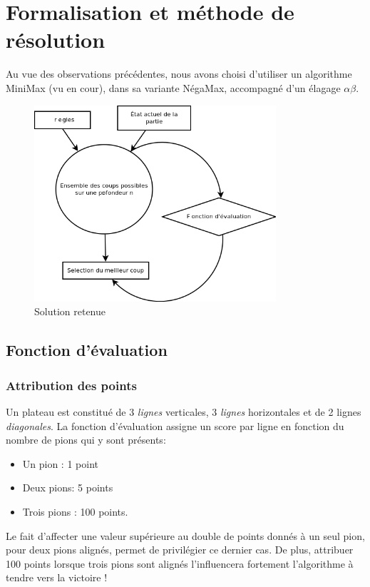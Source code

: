 \documentclass[a4paper,12pt]{article}
\begin{document}
\section{Formalisation et méthode de résolution}
Au vue des observations précédentes, nous avons choisi d'utiliser un algorithme MiniMax (vu en cour), dans sa variante NégaMax, accompagné d'un élagage $\alpha\beta$.
\begin{figure}[H]
    \includegraphics[width=0.8\textwidth]{./pix/methode.png}
    \centering
    \caption{Solution retenue}
\end{figure}

\subsection{Fonction d'évaluation}
\subsubsection{Attribution des points}
Un plateau est constitué de 3 \emph{lignes} verticales, 3 \emph{lignes} horizontales et de 2 lignes \emph{diagonales}. La fonction d'évaluation assigne un score par ligne en fonction du nombre de pions qui y sont présents:
\vspace{1em} %
\begin{itemize}
	\item Un pion : 1 point
	\item Deux pions: 5 points
	\item Trois pions : 100 points.
\end{itemize}
\vspace{1em} %
Le fait d'affecter une valeur supérieure au double de points donnés à un seul pion, pour deux pions alignés, permet de privilégier ce dernier cas. De plus, attribuer 100 points lorsque trois pions sont alignés l'influencera fortement l'algorithme à tendre vers la victoire !
\end{document}
